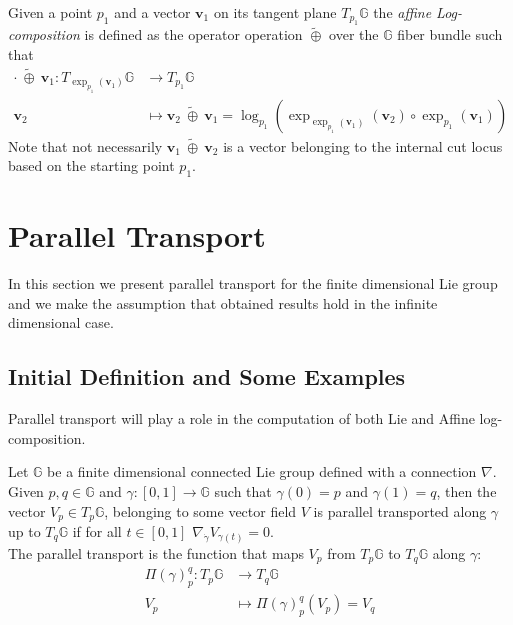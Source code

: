 Given a point $p_1$ and a vector $\mathbf{v}_{1}$ on its tangent plane $T_{p_1}\mathbb{G}$ the \emph{affine Log-composition} is defined as the operator operation $\tilde{\oplus} $ over the $\mathbb{G}$ fiber bundle such that 
\begin{align*}
\cdot ~ \tilde{\oplus} ~ \mathbf{v}_{1}  : T_{\exp_{p_1}(\mathbf{v}_{1})}\mathbb{G}  & \longrightarrow T_{p_1}\mathbb{G}   
\\
\mathbf{v}_{2}&\longmapsto \mathbf{v}_{2}~\tilde{\oplus}~ \mathbf{v}_{1}
=
\log_{p_1}(\exp_{\exp_{p_1}(\mathbf{v}_{1})}(\mathbf{v}_{2})\circ\exp_{p_1}(\mathbf{v}_{1}))
\end{align*}
Note that not necessarily $\mathbf{v}_{1}~\tilde{\oplus}~ \mathbf{v}_{2}$ is a vector belonging to the internal cut locus based on the starting point $p_{1}$.


\section{Parallel Transport}\label{se:parallel_transport}

In this section we present parallel transport for the finite dimensional Lie group and we make the assumption that obtained results hold in the infinite dimensional case.

\subsection{Initial Definition and Some Examples}
Parallel transport will play a role in the computation of both Lie and Affine log-composition.
\begin{definition}
	Let $\mathbb{G}$ be a finite dimensional connected Lie group defined with a connection $\nabla$. Given $p,q \in \mathbb{G}$ and $\gamma : [0,1] \rightarrow \mathbb{G}$ such that $\gamma(0) = p$ and $\gamma(1) = q$, then the vector $V_{p} \in T_{p}\mathbb{G}$, belonging to some vector field $V$ is parallel transported along $\gamma$ up to $T_{q}\mathbb{G}$ if for all $t \in  [0,1]$ $\nabla_{\dot{\gamma}}V_{\gamma(t)} = 0$.\\
	The parallel transport is the function that maps $V_{p}$ from $T_{p}\mathbb{G}$ to $T_{q}\mathbb{G}$ along $\gamma$:
	\begin{align*}
	\Pi(\gamma)_{p}^{q} :  T_{p}\mathbb{G} & \longrightarrow T_{q}\mathbb{G}  \\
	V_{p}&\longmapsto \Pi(\gamma)_{p}^{q}(V_{p}) = V_{q}
	\end{align*}
\end{definition}

